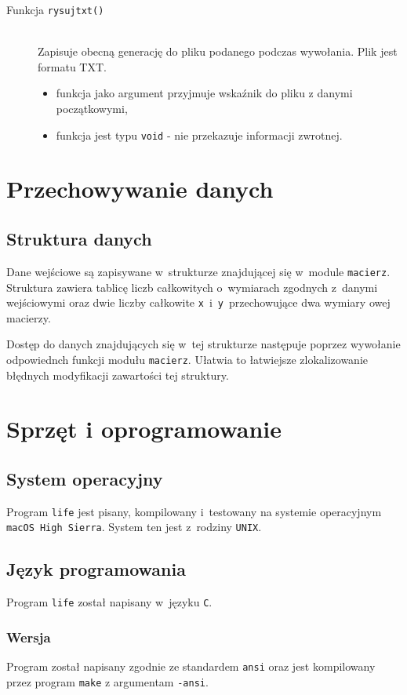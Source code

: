 \documentclass[a4paper,12pt,oneside]{article}
\begin{document}
\begin{description}
\item[Funkcja \texttt{rysujtxt()}] \hfill \\
Zapisuje obecną generację do pliku podanego podczas wywołania. Plik jest formatu TXT.
\begin{itemize}
\item funkcja jako argument przyjmuje wskaźnik do pliku z danymi początkowymi,
\item funkcja jest typu \verb+void+ - nie przekazuje informacji zwrotnej.
\end{itemize}

\end{description}

\section{Przechowywanie danych}
\subsection{Struktura danych}
Dane wejściowe są zapisywane w~strukturze znajdującej się w~module \verb+macierz+. Struktura zawiera tablicę liczb całkowitych o~wymiarach zgodnych z~danymi wejściowymi oraz dwie liczby całkowite \verb+x+~i~\verb+y+~przechowujące dwa wymiary owej macierzy. 
\par Dostęp do danych znajdujących się w~tej strukturze następuje poprzez wywołanie odpowiednch funkcji modułu \verb+macierz+. Ułatwia to łatwiejsze zlokalizowanie błędnych modyfikacji zawartości tej struktury.

\section{Sprzęt i oprogramowanie}

\subsection{System operacyjny}
Program \verb+life+ jest pisany, kompilowany i~testowany na systemie operacyjnym \verb+macOS High Sierra+. System ten jest z~rodziny \verb+UNIX+.

\subsection{Język programowania}
Program \verb+life+ został napisany w~języku \verb+C+.

\subsubsection{Wersja}
Program został napisany zgodnie ze standardem \verb+ansi+ oraz jest kompilowany przez program \verb+make+ z argumentam \verb+-ansi+.
\end{document}
